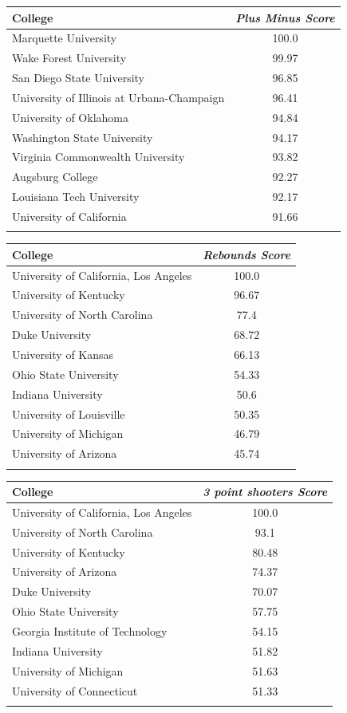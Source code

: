 \documentclass[10pt,a4paper,twocolumn]{article}
\begin{document}
\begin{table}[t]
	\begin{tabular}{lc}
		College & \textit{Plus Minus Score}  \\
		\hline
		Marquette University & 100.0\\
		Wake Forest University & 99.97\\
		San Diego State University & 96.85\\
		University of Illinois at Urbana-Champaign & 96.41\\
		University of Oklahoma & 94.84\\
		Washington State University & 94.17\\
		Virginia Commonwealth University & 93.82\\
		Augsburg College & 92.27\\
		Louisiana Tech University & 92.17\\
		University of California & 91.66\\
		&\\
	\end{tabular}
	
	\begin{tabular}{lc}
		College & \textit{Rebounds Score}  \\
		\hline
		University of California, Los Angeles & 100.0\\
		University of Kentucky & 96.67\\
		University of North Carolina & 77.4\\
		Duke University & 68.72\\
		University of Kansas & 66.13\\
		Ohio State University & 54.33\\
		Indiana University & 50.6\\
		University of Louisville & 50.35\\
		University of Michigan & 46.79\\
		University of Arizona & 45.74\\
		&\\
		
	\end{tabular}
	
	\begin{tabular}{lc}
		College & \textit{3 point shooters Score}  \\
		\hline
		University of California, Los Angeles & 100.0\\
		University of North Carolina & 93.1\\
		University of Kentucky & 80.48\\
		University of Arizona & 74.37\\
		Duke University & 70.07\\
		Ohio State University & 57.75\\
		Georgia Institute of Technology & 54.15\\
		Indiana University & 51.82\\
		University of Michigan & 51.63\\
		University of Connecticut & 51.33\\
		&\\
		

\end{tabular}
\end{table}
\end{document}
